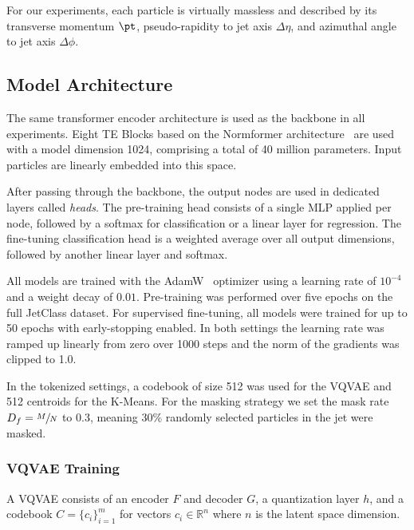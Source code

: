 For our experiments, each particle is virtually massless and described by its transverse momentum $\pt$, pseudo-rapidity to jet axis $\Delta\eta$, and azimuthal angle to jet axis $\Delta\phi$.

\subsection{Model Architecture}

The same transformer encoder architecture is used as the backbone in all experiments.
Eight TE Blocks based on the Normformer architecture~\cite{Normformer} are used with a model dimension 1024, comprising a total of 40 million parameters.
Input particles are linearly embedded into this space.

After passing through the backbone, the output nodes are used in dedicated layers called \textit{heads}.
The pre-training head consists of a single MLP applied per node, followed by a softmax for classification or a linear layer for regression.
The fine-tuning classification head is a weighted average over all output dimensions, followed by another linear layer and softmax.

All models are trained with the AdamW~\cite{AdamW} optimizer using a learning rate of $10^{-4}$ and a weight decay of $0.01$.
Pre-training was performed over five epochs on the full JetClass dataset.
For supervised fine-tuning, all models were trained for up to 50 epochs with early-stopping enabled.
In both settings the learning rate was ramped up linearly from zero over 1000 steps and the norm of the gradients was clipped to 1.0.

In the tokenized settings, a codebook of size 512 was used for the VQVAE and 512 centroids for the K-Means.
For the masking strategy we set the mask rate $D_f=\sfrac{M}{N}$ to 0.3, meaning 30\% randomly selected particles in the jet were masked.

\subsubsection{VQVAE Training}

A VQVAE consists of an encoder $F$ and decoder $G$, a quantization layer $h$, and a codebook ${C}=\{c_i\}_{i=1}^m$ for vectors $c_i \in \mathbb{R}^n$ where $n$ is the latent space dimension.

